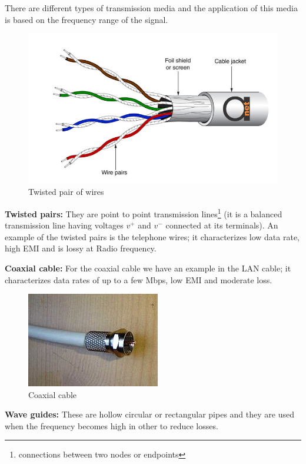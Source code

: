 There are different types of transmission media and the application of this media is based on the frequency range of the signal. \begin{figure}[h]
\centering
\includegraphics[width=1\linewidth]{./graphics/twistedpairs}
\caption{Twisted pair of wires}
\end{figure} 

\textbf{Twisted pairs:} They are point to point transmission lines\footnote{connections between two nodes or endpoints} (it is a balanced transmission line having voltages $v^{+}$ and $v^{-}$ connected at its terminals). An example of the twisted pairs is the telephone wires; it characterizes low data rate, high EMI and is lossy at Radio frequency.

\textbf{Coaxial cable:} For the coaxial cable we have an example in the LAN cable; it characterizes data rates of up to a few Mbps, low EMI and moderate loss.
\begin{figure}[h]
\centering
\includegraphics[scale=0.4]{./graphics/coaxialcable}
\caption{Coaxial cable}
\end{figure}

\textbf{Wave guides:} These are hollow circular or rectangular pipes and they are used when the frequency becomes high in other to reduce losses. 

